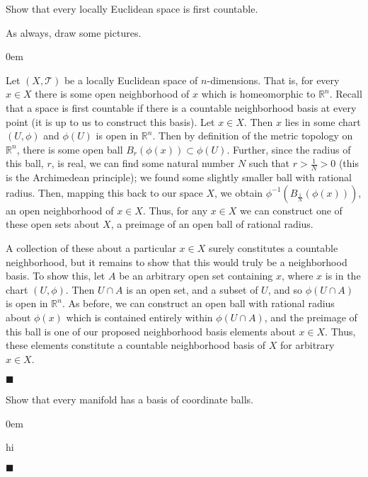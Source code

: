 \documentclass[12pt]{article}
\renewcommand{\qed}{\hfill$\blacksquare$}
\renewenvironment{proof}{\begin{addmargin}[1em]{0em}\begin{newproof}}{\end{newproof}\end{addmargin}\qed}
\newenvironment{problem}[2][Problem]{\begin{trivlist}
\item[\hskip \labelsep {\bfseries #1}\hskip \labelsep {\bfseries #2.}]}{\end{trivlist}}
\begin{document}
\begin{problem}{2-21}
Show that every locally Euclidean space is first countable.
\end{problem}
{\color{red} As always, draw some pictures.}\\
\begin{proof}
Let $\left(X,\mathcal{T}\right)$ be a locally Euclidean space of $n$-dimensions. That is, for every $x\in X$ there is some open neighborhood of $x$ which is homeomorphic to $\mathbb{R}^n$. Recall that a space is first countable if there is a countable neighborhood basis at every point (it is up to us to construct this basis). Let $x \in X$. Then $x$ lies in some chart $\left(U,\phi\right)$ and $\phi\left(U\right)$ is open in $\mathbb{R}^n$. Then by definition of the metric topology on $\mathbb{R}^n$, there is some open ball $B_r\left(\phi\left(x\right)\right) \subset \phi\left(U\right)$. Further, since the radius of this ball, $r$, is real, we can find some natural number $N$ such that $r > \frac{1}{N} > 0$ {\color{red} (this is the Archimedean principle)}; we found some slightly smaller ball with rational radius. Then, mapping this back to our space $X$, we obtain $\phi^{-1}\left( B_{\frac{1}{N}}\left(\phi\left(x\right)\right)\right)$, an open neighborhood of $x \in X$. Thus, for any $x\in X$ we can construct one of these open sets about $X$, a preimage of an open ball of rational radius.

A collection of these about a particular $x\in X$ surely constitutes a countable neighborhood, but it remains to show that this would truly be a neighborhood basis. To show this, let $A$ be an arbitrary open set containing $x$, where $x$ is in the chart $\left(U,\phi\right)$. Then $U\cap A$ is an open set, and a subset of $U$, and so $\phi\left(U\cap A\right)$ is open in $\mathbb{R}^n$. As before, we can construct an open ball with rational radius about $\phi\left(x\right)$ which is contained entirely within $\phi\left(U\cap A\right)$, and the preimage of this ball is one of our proposed neighborhood basis elements about $x\in X$. Thus, these elements constitute a countable neighborhood basis of $X$ for arbitrary $x\in X$.
\end{proof}





\begin{problem}{2-23}
Show that every manifold has a basis of coordinate balls.
\end{problem}
\begin{proof}
hi
\end{proof}
\end{document}
